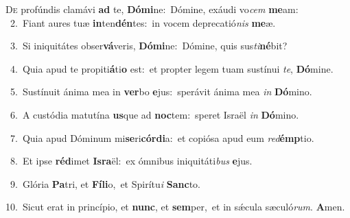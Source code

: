 \lettrine{\initial\textcolor{\initialcolor}{D}}{e} profúndis clamávi \textbf{ad} te, \textbf{Dó}\-\textbf{mi}ne:~\star Dómine, exáudi vo\textit{cem} \textbf{me}\-am:\\
{\numbfont\textcolor{\numbcolor}{~2.}}~Fiant aures tuæ \textbf{in}\-ten\-\textbf{dén}\-tes:~\star in vocem deprecatió\textit{nis} \textbf{me}\-æ.\par
{\numbfont\textcolor{\numbcolor}{~3.}}~Si iniquitátes obser\-\textbf{vá}\-veris, \textbf{Dó}\-\textbf{mi}ne:~\star Dómine, quis sus\-\textit{ti}\-\textbf{né}bit?\par
{\numbfont\textcolor{\numbcolor}{~4.}}~Quia apud te propiti\-\textbf{á}\-ti\textbf{o} est:~\star et propter legem tuam sustínui \textit{te}\-, \textbf{Dó}\-mine.\par
{\numbfont\textcolor{\numbcolor}{~5.}}~Sustínuit ánima mea in \textbf{ver}\-bo \textbf{e}\-jus:~\star sperávit ánima mea \textit{in} \textbf{Dó}\-mino.\par
{\numbfont\textcolor{\numbcolor}{~6.}}~A custódia matutína \textbf{us}\-que ad \textbf{noc}\-tem:~\star speret Israël \textit{in} \textbf{Dó}\-mino.\par
{\numbfont\textcolor{\numbcolor}{~7.}}~Quia apud Dóminum mi\-\textbf{se}\-ri\-\textbf{cór}\-\textbf{di}a:~\star et copiósa apud eum \textit{red}\-\textbf{émp}tio.\par
{\numbfont\textcolor{\numbcolor}{~8.}}~Et ipse \textbf{réd}\-imet \textbf{Is}\-\textbf{ra}ël:~\star ex ómnibus iniquitáti\textit{bus} \textbf{e}\-jus.\par
{\numbfont\textcolor{\numbcolor}{~9.}}~Glória \textbf{Pa}\-tri, et \textbf{Fí}\-\textbf{li}o,~\star et Spirítu\textit{i} \textbf{Sanc}\-to.\par
{\numbfont\textcolor{\numbcolor}{10.}}~Sicut erat in princípio, et \textbf{nunc}\-, et \textbf{sem}\-per,~\star et in sǽcula sæculó\-\textit{rum}\-. \textbf{A}\-men.\par

